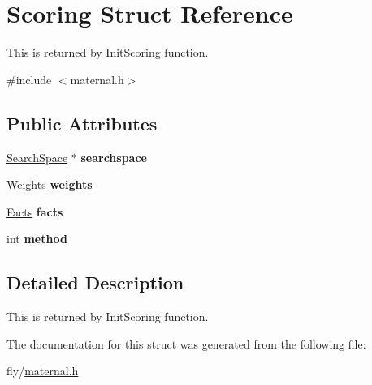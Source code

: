 \hypertarget{structScoring}{
\section{Scoring Struct Reference}
\label{structScoring}
}


This is returned by InitScoring function.  


{\ttfamily \#include $<$maternal.h$>$}\subsection*{Public Attributes}
\begin{DoxyCompactItemize}
\item 
\hypertarget{structScoring_a67365b47f85ae096ab4c0fdc55c6f9ed}{
\hyperlink{structSearchSpace}{SearchSpace} $\ast$ {\bfseries searchspace}}
\label{structScoring_a67365b47f85ae096ab4c0fdc55c6f9ed}

\item 
\hypertarget{structScoring_ade296a0e866efffbf39a2ac9acf3a455}{
\hyperlink{structWeights}{Weights} {\bfseries weights}}
\label{structScoring_ade296a0e866efffbf39a2ac9acf3a455}

\item 
\hypertarget{structScoring_a7c70ab6e0444f583dde761cde01b1c32}{
\hyperlink{structFacts}{Facts} {\bfseries facts}}
\label{structScoring_a7c70ab6e0444f583dde761cde01b1c32}

\item 
\hypertarget{structScoring_a1dd0db7bf1d3766cbce0522a599c6271}{
int {\bfseries method}}
\label{structScoring_a1dd0db7bf1d3766cbce0522a599c6271}

\end{DoxyCompactItemize}


\subsection{Detailed Description}
This is returned by InitScoring function. 

The documentation for this struct was generated from the following file:\begin{DoxyCompactItemize}
\item 
fly/\hyperlink{maternal_8h}{maternal.h}\end{DoxyCompactItemize}
